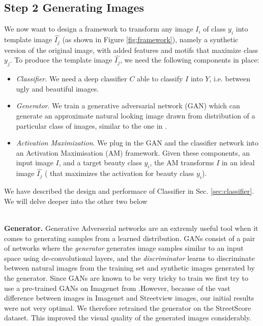 \subsection*{Step 2 Generating Images}
\par 
We now want to design a framework to transform any image $I_i$ of class $y_i$ into template image $\hat{I_j}$ (as shown in Figure \ref{fig:framework}), namely a synthetic version of the original image, with added features and motifs that maximize class $y_j$. 
To produce the template image $\hat{I_j}$, we need the following components in place:
\begin{itemize}
	\item {\textit{Classifier}}. We need a deep classifier $C$ able to classify $I$ into $Y$, i.e. between ugly and beautiful images. %
	
	\item \textit{Generator}. We train a generative adversarial network (GAN) which can generate an approximate natural looking image drawn from distribution of a particular class of images, similar to the one  in \cite{dosovitskiy2016inverting}. 
	
	\item \textit{Activation Maximization}. We plug in the GAN and the classifier network into an Activation Maximisation (AM) framework. Given these components, an input image $I$, and a target beauty class $y_i$, the AM transforms $I$ in an ideal image $\hat{I_j}$ ( that maximizes the activation for beauty class $y_i$).	
\end{itemize}
 
 We have described the design and performace of Classifier in Sec. \ref{sec:classifier}. We will delve deeper into the other two below
 
\mbox{} \\
\noindent
\textbf{Generator.}
 Generative Adverserial networks are an extremly useful tool when it comes to generating samples from a learned distribution\cite{radford2015unsupervised}. GANs consist of a %
 pair of networks where the \textit{generator} %
 generates image samples similar to an input space using de-convolutional layers, and the \textit{discriminator} learns to discriminate between natural images from the training set and synthetic images generated by the generator. %
Since GANs are known to be very tricky to train \cite{gulrajani2017improved}  we first try to use a pre-trained GANs on Imagenet from \cite{nguyen2016synthesizing}.However, because of the vast difference between images in Imagenet and Streetview images, our initial results were not very optimal. We therefore retrained the generator on the StreetScore dataset. %
This improved the visual quality of the generated images considerably.%

